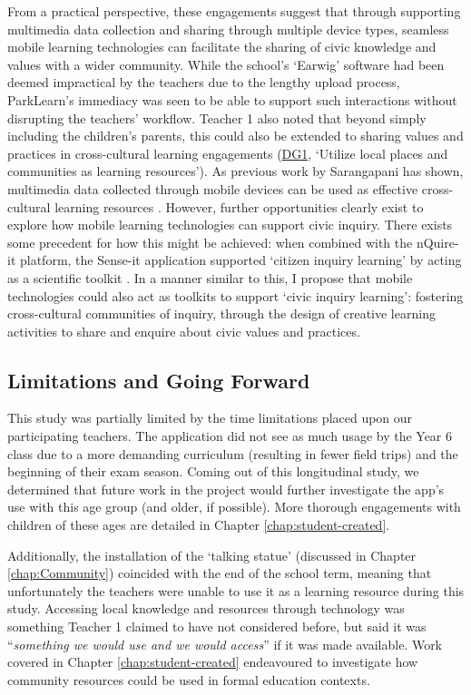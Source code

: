 From a practical perspective, these engagements suggest that through supporting multimedia data collection and sharing through multiple device types, seamless mobile learning technologies can facilitate the sharing of civic knowledge and values with a wider community. While the school's ‘Earwig’ software had been deemed impractical by the teachers due to the lengthy upload process, ParkLearn’s immediacy was seen to be able to support such interactions without disrupting the teachers’ workflow. Teacher 1 also noted that beyond simply including the children’s parents, this could also be extended to sharing values and practices in cross-cultural learning engagements (\hyperref[DG1]{DG1}, `Utilize local places and communities as learning resources'). As previous work by Sarangapani has shown, multimedia data collected through mobile devices can be used as effective cross-cultural learning resources \citep{Sarangapani2016}. However, further opportunities clearly exist to explore how mobile learning technologies can support civic inquiry. There exists some precedent for how this might be achieved: when combined with the nQuire-it platform, the Sense-it application supported ‘citizen inquiry learning’ by acting as a scientific toolkit \citep{Sharples2017}. In a manner similar to this, I propose that mobile technologies could also act as toolkits to support ‘civic inquiry learning’: fostering cross-cultural communities of inquiry, through the design of creative learning activities to share and enquire about civic values and practices.

\subsection{Limitations and Going Forward}

This study was partially limited by the time limitations placed upon our participating teachers. The application did not see as much usage by the Year 6 class due to a more demanding curriculum (resulting in fewer field trips) and the beginning of their exam season. Coming out of this longitudinal study, we determined that future work in the project would further investigate the app’s use with this age group (and older, if possible). More thorough engagements with children of these ages are detailed in Chapter \ref{chap:student-created}.

Additionally, the installation of the ‘talking statue’ (discussed in Chapter \ref{chap:Community}) coincided with the end of the school term, meaning that unfortunately the teachers were unable to use it as a learning resource during this study. Accessing local knowledge and resources through technology was something Teacher 1 claimed to have not considered before, but said it was “\textit{something we would use and we would access}” if it was made available. Work covered in Chapter \ref{chap:student-created} endeavoured to investigate how community resources could be used in formal education contexts. 

